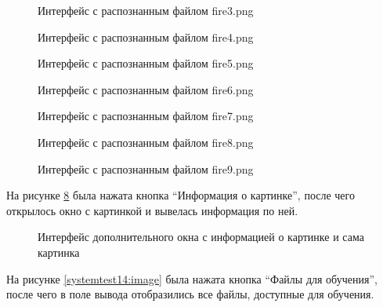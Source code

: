 \begin{figure}[H]
\caption{Интерфейс с распознанным файлом fire3.png}
\label{systemtest6:image}
\end{figure}

\begin{figure}[H]
\caption{Интерфейс с распознанным файлом fire4.png}
\label{systemtest7:image}
\end{figure}

\begin{figure}[H]
\caption{Интерфейс с распознанным файлом fire5.png}
\label{systemtest8:image}
\end{figure}

\begin{figure}[H]
\caption{Интерфейс с распознанным файлом fire6.png}
\label{systemtest9:image}
\end{figure}

\begin{figure}[H]
\caption{Интерфейс с распознанным файлом fire7.png}
\label{systemtest10:image}
\end{figure}

\begin{figure}[H]
\caption{Интерфейс с распознанным файлом fire8.png}
\label{systemtest11:image}
\end{figure}

\begin{figure}[H]
\caption{Интерфейс с распознанным файлом fire9.png}
\label{systemtest12:image}
\end{figure}

На рисунке \ref{systemtest22:image} была нажата кнопка ``Информация о картинке'', после чего открылось окно с картинкой и вывелась информация по ней.

\begin{figure}[H]
\caption{Интерфейс дополнительного окна с информацией о картинке и сама картинка}
\label{systemtest22:image}
\end{figure}

На рисунке \ref{systemtest14:image} была нажата кнопка ``Файлы для обучения'', после чего в поле вывода отобразились все файлы, доступные для обучения.

